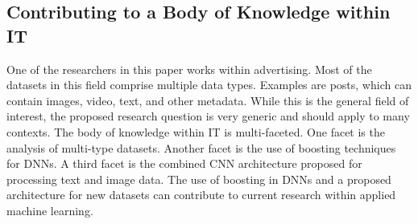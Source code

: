 \subsection{Contributing to a Body of Knowledge within IT}

One of the researchers in this paper works within advertising.  Most of the datasets in this field comprise multiple data types.  Examples are posts, which can contain images, video, text, and other metadata.  While this is the general field of interest, the proposed research question is very generic and should apply to many contexts.  The body of knowledge within IT is multi-faceted.  One facet is the analysis of multi-type datasets.  Another facet is the use of boosting techniques for DNNs.  A third facet is the combined CNN architecture proposed for processing text and image data.  The use of boosting in DNNs and a proposed architecture for new datasets can contribute to current research within applied machine learning.

